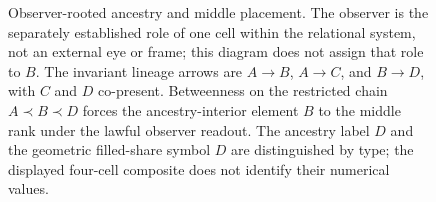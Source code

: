 \begin{figure}[t]
\caption{Observer-rooted ancestry and middle placement.  The observer is the
separately established role of one cell within the relational system, not an
external eye or frame; this diagram does not assign that role to \(B\).  The
invariant lineage arrows are \(A\to B\), \(A\to C\), and \(B\to D\), with
\(C\) and \(D\) co-present.  Betweenness on the restricted chain
\(A\prec B\prec D\) forces the ancestry-interior element \(B\) to the middle
rank under the lawful observer readout.  The ancestry label \(D\) and the
geometric filled-share symbol \(D\) are distinguished by type; the displayed
four-cell composite does not identify their numerical values.}
\label{fig:observer-betweenness}
\end{figure}
